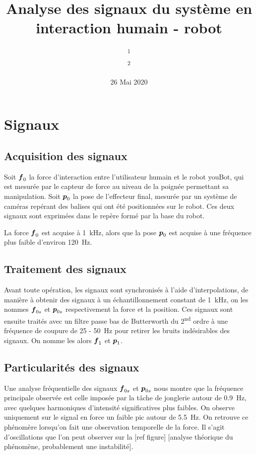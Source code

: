 \documentclass[12pt, a4paper]{article} %
\title{Analyse des signaux du système en interaction humain - robot}
\author{
	\authorstyle{Vincent FORTINEAU\textsuperscript{1,2} \\ Maria MAKAROV\textsuperscript{2}, encadrante \\ Pedro RODRIGUEZ-AYERBE\textsuperscript{2}, co-directeur \\ Isabelle SIEGLER\textsuperscript{1}, co-directrice}  %
	\newline\newline %
	\textsuperscript{1}\institution{Université Paris-Saclay - CIAMS}\\ %
	\textsuperscript{2}\institution{CentraleSupélec - L2S}\\ %
}
\date{26 Mai 2020} %
\numberwithin{equation}{section}
\begin{document}
	
	\section{Signaux}
	
	\subsection{Acquisition des signaux}
	
	Soit $ \vect{f}_0 $ la force d'interaction entre l'utilisateur humain et le robot youBot, qui est mesurée par le capteur de force au niveau de la poignée permettant sa manipulation. Soit $ \vect{p}_0 $ la pose de l'effecteur final, mesurée par un système de caméras repérant des balises qui ont été positionnées sur le robot. Ces deux signaux sont exprimées dans le repère formé par la base du robot.
	
	La force $ \vect{f}_0 $ est acquise à \SI{1}{\kilo\hertz}, alors que la pose $ \vect{p}_0 $ est acquise à une fréquence plus faible d'environ \SI{120}{\hertz}. 
	
	\subsection{Traitement des signaux}
	
	Avant toute opération, les signaux sont synchronisés à l'aide d'interpolations, de manière à obtenir des signaux à un échantillonnement constant de \SI{1}{\kilo\hertz}, on les nommes $ \vect{f}_{0s} $ et $ \vect{p}_{0s} $ respectivement la force et la position. Ces signaux sont ensuite traités avec un filtre passe bas de Butterworth du 2\textsuperscript{nd} ordre à une fréquence de coupure de \SI{25}{} - \SI{50}{\hertz} pour retirer les bruits indésirables des signaux. On nomme les alors $ \vect{f}_1 $ et $ \vect{p}_1 $.
	
	\subsection{Particularités des signaux} \label{signal_specificities}
	
	Une analyse fréquentielle des signaux $ \vect{f}_{0s} $ et $ \vect{p}_{0s} $ nous montre que la fréquence principale observée est celle imposée par la tâche de jonglerie autour de \SI{0.9}{\hertz}, avec quelques harmoniques d'intensité significatives plus faibles. On observe uniquement sur le signal en force un faible pic autour de \SI{5.5}{\hertz}. On retrouve ce phénomère lorsqu'on fait une observation temporelle de la force. Il s'agit d'oscillations que l'on peut observer sur la [ref figure] [analyse théorique du phénomène, probablement une instabilité].
	
\end{document}
